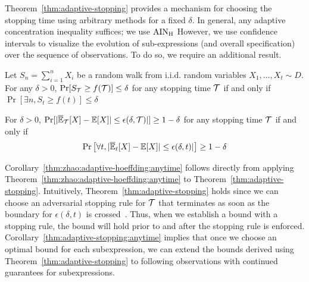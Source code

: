 \begin{subappendices}


Theorem~\ref{thm:adaptive-stopping} provides a mechanism for choosing the stopping time using arbitrary methods for a fixed $\delta$. 
In general, any adaptive concentration inequality suffices; we use $\rm{AIN}_H$ %
However, we use confidence intervals to visualize the evolution of sub-expressions (and overall specification) over the sequence of observations. 
To do so, we require an additional result.

\begin{theorem}\cite[Proposition 1, Lemma 1]{zhao2016adaptive}
Let $S_n = \sum_{i=1}^n X_i$ be a random walk from i.i.d. random variables $X_1, \dots, X_t \sim D$. For any $\delta > 0$,
$\Pr[S_{\mathcal{T}} \geq f({\mathcal{T}})] \leq \delta$
for any stopping time ${\mathcal{T}}$ if and only if
$\Pr\left[\exists n, S_t \geq f(t) \right] \leq \delta$

\label{thm:zhao:adaptive-hoeffding:anytime}
\end{theorem}

\begin{corollary}
\label{thm:adaptive-stopping:anytime}
For $\delta > 0$, $\Pr[|\overline{\mathbb{E}}_{\mathcal{T}}[X] - \mathbb{E}[X]| \leq \epsilon(\delta, {\mathcal{T}})|] \geq 1 - \delta $
for any stopping time ${\mathcal{T}}$ if and only if
\[
\Pr\left[\forall t, |\overline{\mathbb{E}}_t[X] - \mathbb{E}[X]| \leq \epsilon(\delta, t)| \right] \geq 1 - \delta
\]
\end{corollary}
Corollary~\ref{thm:zhao:adaptive-hoeffding:anytime} follows directly from applying Theorem~\ref{thm:zhao:adaptive-hoeffding:anytime} to Theorem~\ref{thm:adaptive-stopping}.
Intuitively, Theorem~\ref{thm:adaptive-stopping} holds since we can choose an adversarial stopping rule for ${\mathcal{T}}$ that terminates as soon as the boundary for $\epsilon(\delta, t)$ is crossed~\citep{zhao2016adaptive}. 
Thus, when we establish a bound with a stopping rule, %
the bound will hold prior to and after the stopping rule is enforced.
Corollary~\ref{thm:adaptive-stopping:anytime} implies that once we choose an optimal bound for each subexpression, we can extend the bounds derived using Theorem~\ref{thm:adaptive-stopping} to following observations with continued guarantees for subexpressions.


\end{subappendices}

